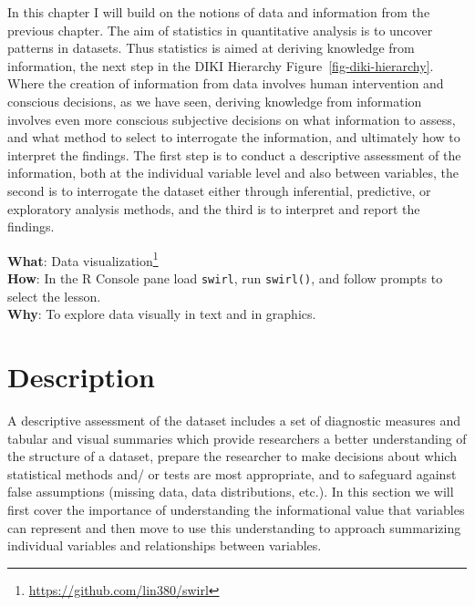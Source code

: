 \documentclass[
  letterpaper,
]{scrbook}
\DeclareRobustCommand{\href}[2]{#2\footnote{\url{#1}}}
\begin{document}
In this chapter I will build on the notions of data and information from
the previous chapter. The aim of statistics in quantitative analysis is
to uncover patterns in datasets. Thus statistics is aimed at deriving
knowledge from information, the next step in the DIKI Hierarchy
Figure~\ref{fig-diki-hierarchy}. Where the creation of information from
data involves human intervention and conscious decisions, as we have
seen, deriving knowledge from information involves even more conscious
subjective decisions on what information to assess, and what method to
select to interrogate the information, and ultimately how to interpret
the findings. The first step is to conduct a descriptive assessment of
the information, both at the individual variable level and also between
variables, the second is to interrogate the dataset either through
inferential, predictive, or exploratory analysis methods, and the third
is to interpret and report the findings.

\begin{tcolorbox}[enhanced jigsaw, title=\textcolor{quarto-callout-tip-color}{\faLightbulb}\hspace{0.5em}{Interactive programming}, titlerule=0mm, toptitle=1mm, colbacktitle=quarto-callout-tip-color!10!white, bottomtitle=1mm, left=2mm, colframe=quarto-callout-tip-color-frame, breakable, toprule=.15mm, colback=white, opacitybacktitle=0.6, leftrule=.75mm, rightrule=.15mm, bottomrule=.15mm, arc=.35mm, coltitle=black, opacityback=0]

\textbf{What}: \href{https://github.com/lin380/swirl}{Data
visualization}\\
\textbf{How}: In the R Console pane load \texttt{swirl}, run
\texttt{swirl()}, and follow prompts to select the lesson.\\
\textbf{Why}: To explore data visually in text and in graphics.

\end{tcolorbox}

\hypertarget{description}{%
\section{Description}\label{description}}

A descriptive assessment of the dataset includes a set of diagnostic
measures and tabular and visual summaries which provide researchers a
better understanding of the structure of a dataset, prepare the
researcher to make decisions about which statistical methods and/ or
tests are most appropriate, and to safeguard against false assumptions
(missing data, data distributions, etc.). In this section we will first
cover the importance of understanding the informational value that
variables can represent and then move to use this understanding to
approach summarizing individual variables and relationships between
variables.
\end{document}
